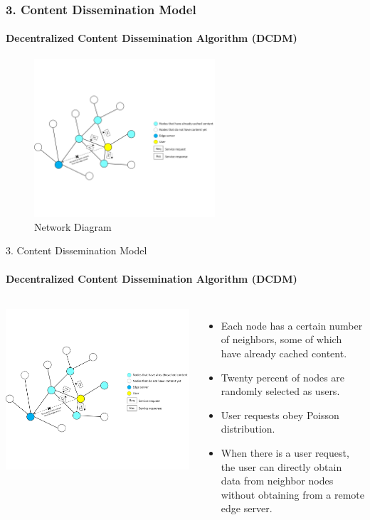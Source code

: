 \documentclass{beamer}		%
\begin{document}
\begin{frame}
\frametitle{3. Content Dissemination Model}
\framesubtitle{Decentralized Content Dissemination Algorithm (DCDM)}
\begin{figure}[t]
    \centering
    \includegraphics[width=0.6\textwidth]{Figure2.png}
    \caption{Network Diagram}
    \label{fig:2}
\end{figure}
\end{frame}

\begin{frame}{3. Content Dissemination Model}
\framesubtitle{Decentralized Content Dissemination Algorithm (DCDM)}
\begin{columns}
\includegraphics[scale=0.07]{Figure2.png}
\begin{itemize}
    \item Each node has a certain number of neighbors, some of which have already cached content. 
    \item Twenty percent of nodes are randomly selected as users. 
    \item User requests obey Poisson distribution.
    \item When there is a user request, the user can directly obtain data from neighbor nodes without obtaining from a remote edge server.
\end{itemize}
\end{columns}
\end{frame}
\end{document}
